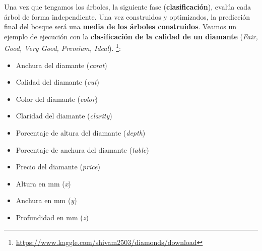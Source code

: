 \documentclass [a4paper] {article}
\begin{document}
\newpage
Una vez que tengamos los árboles, la siguiente fase (\textbf{clasificación}), evalúa cada árbol de forma independiente. Una vez construidos y optimizados, la predicción final del bosque será una \textbf{media de los árboles construidos}.
Veamos un ejemplo de ejecución con la \textbf{clasificación de la calidad de un diamante} (\textit{Fair, Good, Very Good, Premium, Ideal}). \footnote{\url{https://www.kaggle.com/shivam2503/diamonds/download}}:
\begin{itemize}
  \item Anchura del diamante (\textit{carat})
  \item Calidad del diamante (\textit{cut})
  \item Color del diamante (\textit{color})
  \item Claridad del diamante (\textit{clarity})
  \item Porcentaje de altura del diamante (\textit{depth})
  \item Porcentaje de anchura del diamante (\textit{table})
  \item Precio del diamante (\textit{price})
  \item Altura en mm (\textit{x})
  \item Anchura en mm (\textit{y})
  \item Profundidad en mm (\textit{z})
\end{itemize}
\end{document}
